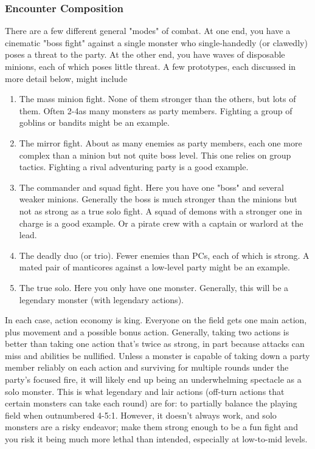 \documentclass[10pt,twoside,openany,bg=none]{dndbook}
\begin{document}
\subsubsection{Encounter Composition}
There are a few different general "modes" of combat. At one end, you have a cinematic "boss fight" against a single monster who single-handedly (or clawedly) poses a threat to the party. At the other end, you have waves of disposable minions, each of which poses little threat. A few prototypes, each discussed in more detail below, might include
\begin{enumerate}
    \item The mass minion fight. None of them stronger than the others, but lots of them. Often 2-4\texttimes as many monsters as party members. Fighting a group of goblins or bandits might be an example.
    \item The mirror fight. About as many enemies as party members, each one more complex than a minion but not quite boss level. This one relies on group tactics. Fighting a rival adventuring party is a good example.
    \item The commander and squad fight. Here you have one "boss" and several weaker minions. Generally the boss is much stronger than the minions but not as strong as a true solo fight. A squad of demons with a stronger one in charge is a good example. Or a pirate crew with a captain or warlord at the lead.
    \item The deadly duo (or trio). Fewer enemies than PCs, each of which is strong. A mated pair of manticores against a low-level party might be an example.
    \item The true solo. Here you only have one monster. Generally, this will be a legendary monster (with legendary actions).
\end{enumerate}

In each case, action economy is king. Everyone on the field gets one main action, plus movement and a possible bonus action. Generally, taking two actions is better than taking one action that's twice as strong, in part because attacks can miss and abilities be nullified. Unless a monster is capable of taking down a party member reliably on each action and surviving for multiple rounds under the party's focused fire, it will likely end up being an underwhelming spectacle as a solo monster. This is what legendary and lair actions (off-turn actions that certain monsters can take each round) are for: to partially balance the playing field when outnumbered 4-5:1. However, it doesn't always work, and solo monsters are a risky endeavor; make them strong enough to be a fun fight and you risk it being much more lethal than intended, especially at low-to-mid levels. 
\end{document}
